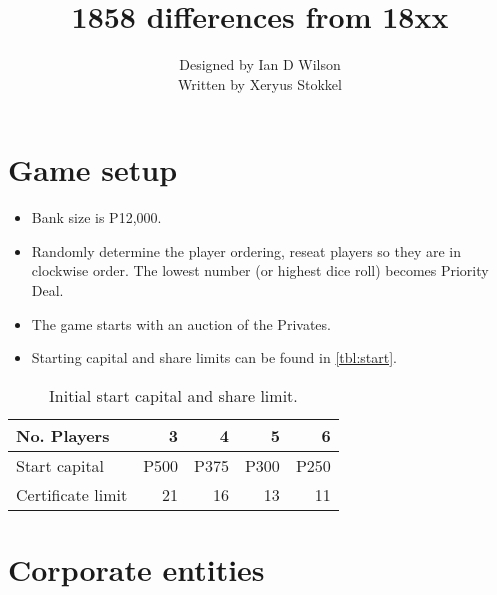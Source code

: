 \documentclass[a4paper,twocolumn]{article}
\title{1858 differences from 18xx}
\author{Designed by Ian D Wilson\\
	Written by Xeryus Stokkel}
\date{}
\begin{document}
\maketitle

\section{Game setup}
\begin{itemize}
	\item Bank size is P12,000.
	\item Randomly determine the player ordering, reseat players so they are in
	clockwise order. The lowest number (or highest dice roll) becomes Priority
	Deal.
	\item The game starts with an auction of the Privates.
	\item Starting capital and share limits can be found in \autoref{tbl:start}.
\end{itemize}

\begin{table}
	\centering
	\caption{Initial start capital and share limit.}
	\label{tbl:start}
	\begin{tabular}{l|r|r|r|r}
		No. Players & 3 & 4 & 5 & 6 \\ \hline
		Start capital & P500 & P375 & P300 & P250 \\
		Certificate limit & 21 & 16 & 13 & 11 \\
	\end{tabular}
\end{table}

\section{Corporate entities}
\end{document}
